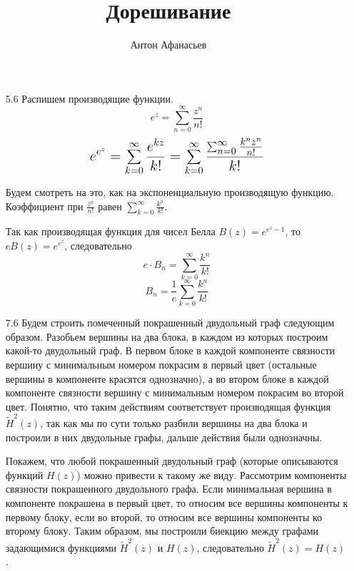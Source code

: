 \documentclass[10pt]{article}
\begin{document}
\title{Дорешивание}
\author{Антон Афанасьев}
\maketitle

\begin{enumerate}
\item[5.6] Распишем производящие функции.
$$e^z = \sum_{n=0}^\infty \frac{z^n}{n!}$$
$$\mathlarger{ \mathlarger{ e^{e^z} = \sum_{k=0}^\infty \frac{e^{kz}}{k!} = \sum_{k=0}^\infty \frac{\sum_{n=0}^\infty \frac{k^n z^n}{n!}}{k!}}}$$

Будем смотреть на это, как на экспоненциальную производящую функцию. Коэффициент при $\frac{z^n}{n!}$ равен $\sum_{k=0}^\infty \frac{k^n}{k!}$. 

Так как производящая функция для чисел Белла $B(z) = e^{e^z -1}$, то $eB(z) = e^{e^z}$, следовательно 
$$e \cdot B_n = \sum_{k=0}^\infty \frac{k^n}{k!}$$
$$B_n = \frac{1}{e}  \sum_{k=0}^\infty \frac{k^n}{k!}$$

\item[7.6] Будем строить помеченный покрашенный двудольный граф следующим образом. Разобьем вершины на два блока, в каждом из которых построим какой-то двудольный граф. В первом блоке в каждой компоненте связности вершину с минимальным номером покрасим в первый цвет (остальные вершины в компоненте красятся однозначно), а во втором блоке в каждой компоненте связности вершину с минимальным номером покрасим во второй цвет. Понятно, что таким действиям соответствует производящая функция $\widetilde{H}^2(z)$, так как мы по сути только разбили вершины на два блока и построили в них двудольные графы, дальше действия были однозначны. 

Покажем, что любой покрашенный двудольный граф (которые описываются функций $H(z)$) можно привести к такому же виду. Рассмотрим компоненты связности покрашенного двудольного графа. Если минимальная вершина в компоненте покрашена в первый цвет, то относим все вершины компоненты к первому блоку, если во второй, то относим все вершины компоненты ко второму блоку. Таким образом, мы построили биекцию между графами задающимися функциями $\widetilde{H}^2(z)$ и $H(z)$, следовательно $\widetilde{H}^2(z) = H(z)$.
\end{enumerate}
\end{document}
